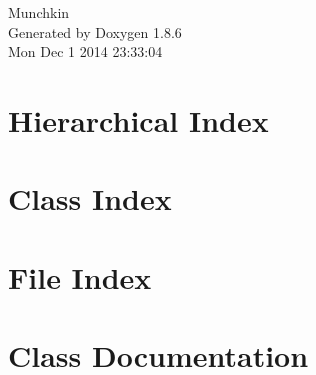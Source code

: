 \documentclass[twoside]{book}
\newcommand{\clearemptydoublepage}{%
  \newpage{\pagestyle{empty}\cleardoublepage}%
}
\begin{document}
\hypersetup{pageanchor=false}
\begin{titlepage}
\vspace*{7cm}
\begin{center}%
{\Large Munchkin }\\
\vspace*{1cm}
{\large Generated by Doxygen 1.8.6}\\
\vspace*{0.5cm}
{\small Mon Dec 1 2014 23:33:04}\\
\end{center}
\end{titlepage}
\clearemptydoublepage
\tableofcontents
\clearemptydoublepage
{}
\hypersetup{pageanchor=true}

\chapter{Hierarchical Index}

\chapter{Class Index}

\chapter{File Index}

\chapter{Class Documentation}
































\end{document}
